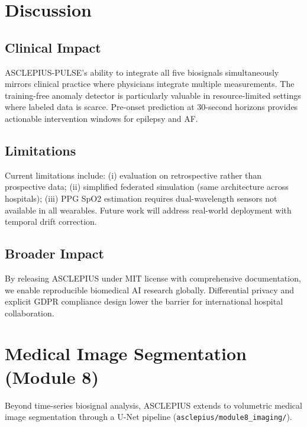 \documentclass[journal]{IEEEtran}
\begin{document}
\section{Discussion}
\label{sec:discussion}

\subsection{Clinical Impact}

ASCLEPIUS-PULSE's ability to integrate all five biosignals simultaneously
mirrors clinical practice where physicians integrate multiple measurements.
The training-free anomaly detector is particularly valuable in resource-limited
settings where labeled data is scarce. Pre-onset prediction at 30-second
horizons provides actionable intervention windows for epilepsy and AF.

\subsection{Limitations}

Current limitations include: (i) evaluation on retrospective rather than
prospective data; (ii) simplified federated simulation (same architecture
across hospitals); (iii) PPG SpO2 estimation requires dual-wavelength sensors
not available in all wearables. Future work will address real-world deployment
with temporal drift correction.

\subsection{Broader Impact}

By releasing ASCLEPIUS under MIT license with comprehensive documentation,
we enable reproducible biomedical AI research globally. Differential privacy
and explicit GDPR compliance design lower the barrier for international
hospital collaboration.

\section{Medical Image Segmentation (Module 8)}
\label{sec:imaging}

Beyond time-series biosignal analysis, ASCLEPIUS extends to volumetric medical image segmentation through a U-Net pipeline (\texttt{asclepius/module8\_imaging/}).
\end{document}
